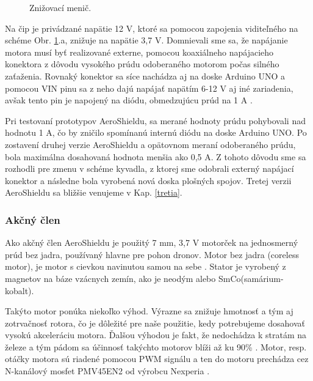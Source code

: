 \begin{figure}[!tbh]
	\hfill
	\hfill
	\hfill
	\caption{Znižovací menič.}\label{OBRAZOK 2.1}
\end{figure}

Na čip je privádzané napätie 12 V, ktoré sa pomocou zapojenia viditeľného na schéme Obr. \ref{OBRAZOK 2.1}.a, znižuje na napätie 3,7 V. Domnievali sme sa, že napájanie motora musí byť realizované externe, pomocou koaxiálneho napájacieho konektora z dôvodu vysokého prúdu odoberaného motorom počas silného zaťaženia. Rovnaký konektor sa síce nachádza aj na doske Arduino UNO a pomocou VIN pinu sa z neho dajú napájať napätím 6-12 V aj iné zariadenia, avšak tento pin je napojený na diódu, obmedzujúcu prúd na 1 A \cite{ampere}\cite{ampere2}. 

Pri testovaní prototypov AeroShieldu, sa merané hodnoty prúdu pohybovali nad hodnotu 1 A, čo by zničilo spomínanú internú diódu na doske Arduino UNO. 
Po zostavení druhej verzie AeroShieldu a opätovnom meraní odoberaného prúdu, bola maximálna dosahovaná hodnota menšia ako 0,5 A. Z tohoto dôvodu sme sa rozhodli pre zmenu v schéme kyvadla, z ktorej sme odobrali externý napájací konektor a následne bola vyrobená nová doska plošných spojov. Tretej verzii AeroShieldu sa bližšie venujeme v Kap. \ref{tretia}.

\subsubsection{Akčný člen}
\label{akcclen}

Ako akčný člen AeroShieldu je použitý 7 mm, 3,7 V motorček na jednosmerný prúd bez jadra, používaný hlavne pre pohon dronov. Motor bez jadra (coreless motor), je motor s cievkou navinutou samou na sebe \cite{coreless}. Stator je vyrobený z magnetov na báze vzácnych zemín, ako je neodým alebo SmCo(samárium-kobalt).

Takýto motor ponúka niekoľko výhod. Výrazne sa znižuje hmotnosť a tým aj zotrvačnosť rotora, čo je dôležité pre naše použitie, kedy potrebujeme dosahovať vysokú akceleráciu motora. Ďalšou výhodou je fakt, že nedochádza k stratám na železe a tým pádom sa účinnosť takýchto motorov blíži až ku 90\% \cite{5545147}. Motor, resp. otáčky motora sú riadené pomocou PWM signálu a ten do motoru prechádza cez N-kanálový mosfet PMV45EN2 od výrobcu Nexperia \cite{pmv}.


